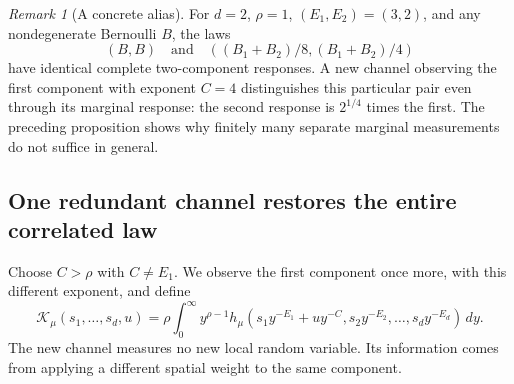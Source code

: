 \documentclass[11pt,letterpaper]{article}
\theoremstyle{definition}
\theoremstyle{remark}
\newtheorem{remark}[theorem]{Remark}
\newcommand{\1}{\mathbf 1}
\begin{document}
\begin{remark}[A concrete alias]
For $d=2$, $\rho=1$, $(E_1,E_2)=(3,2)$, and any nondegenerate Bernoulli
$B$, the laws
\[
 (B,B)\quad\text{and}\quad
 ((B_1+B_2)/8,(B_1+B_2)/4)
\]
have identical complete two-component responses. A new channel observing
the first component with exponent $C=4$ distinguishes this particular
pair even through its marginal response: the second response is
$2^{1/4}$ times the first. The preceding proposition shows why finitely
many separate marginal measurements do not suffice in general.
\end{remark}

\subsection{One redundant channel restores the entire correlated law}

Choose $C>\rho$ with $C\ne E_1$. We observe the first component once more,
with this different exponent, and define
\begin{equation}\label{p06:eq:augmented-correlated-H}
 \mathcal K_\mu(s_1,\ldots,s_d,u)
 =\rho\int_0^\infty y^{\rho-1}
 h_\mu(s_1y^{-E_1}+uy^{-C},s_2y^{-E_2},\ldots,s_dy^{-E_d})\,dy.
\end{equation}
The new channel measures no new local random variable. Its information
comes from applying a different spatial weight to the same component.
\end{document}
